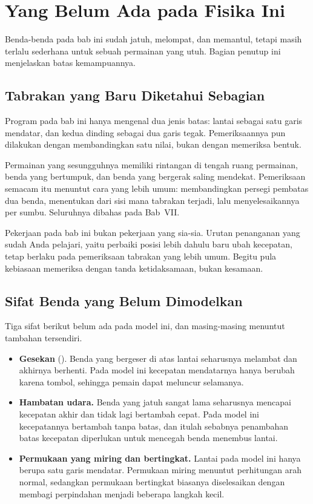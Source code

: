 \section{Yang Belum Ada pada Fisika Ini}
\label{sec:belum-ada-fisika}

Benda-benda pada bab ini sudah jatuh, melompat, dan memantul, tetapi masih
terlalu sederhana untuk sebuah permainan yang utuh. Bagian penutup ini
menjelaskan batas kemampuannya.

\subsection{Tabrakan yang Baru Diketahui Sebagian}

Program pada bab ini hanya mengenal dua jenis batas: lantai sebagai satu garis
mendatar, dan kedua dinding sebagai dua garis tegak. Pemeriksaannya pun
dilakukan dengan membandingkan satu nilai, bukan dengan memeriksa bentuk.

Permainan yang sesungguhnya memiliki rintangan di tengah ruang permainan,
benda yang bertumpuk, dan benda yang bergerak saling mendekat. Pemeriksaan
semacam itu menuntut cara yang lebih umum: membandingkan persegi pembatas dua
benda, menentukan dari sisi mana tabrakan terjadi, lalu menyelesaikannya per
sumbu. Seluruhnya dibahas pada Bab~VII.

Pekerjaan pada bab ini bukan pekerjaan yang sia-sia. Urutan penanganan yang
sudah Anda pelajari, yaitu perbaiki posisi lebih dahulu baru ubah kecepatan,
tetap berlaku pada pemeriksaan tabrakan yang lebih umum. Begitu pula kebiasaan
memeriksa dengan tanda ketidaksamaan, bukan kesamaan.

\subsection{Sifat Benda yang Belum Dimodelkan}

Tiga sifat berikut belum ada pada model ini, dan masing-masing menuntut
tambahan tersendiri.

\begin{itemize}
  \item \textbf{Gesekan} (). Benda yang bergeser di atas
        lantai seharusnya melambat dan akhirnya berhenti. Pada model ini
        kecepatan mendatarnya hanya berubah karena tombol, sehingga pemain
        dapat meluncur selamanya.
  \item \textbf{Hambatan udara.} Benda yang jatuh sangat lama seharusnya
        mencapai kecepatan akhir dan tidak lagi bertambah cepat. Pada model
        ini kecepatannya bertambah tanpa batas, dan itulah sebabnya penambahan
        batas kecepatan diperlukan untuk mencegah benda menembus lantai.
  \item \textbf{Permukaan yang miring dan bertingkat.} Lantai pada model ini
        hanya berupa satu garis mendatar. Permukaan miring menuntut
        perhitungan arah normal, sedangkan permukaan bertingkat biasanya
        diselesaikan dengan membagi perpindahan menjadi beberapa langkah
        kecil.
\end{itemize}

